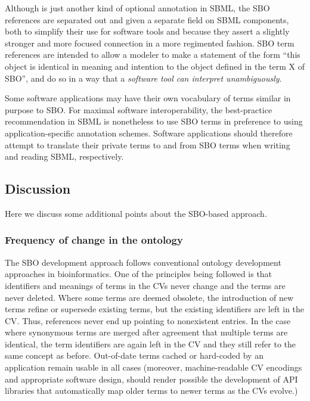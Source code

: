 Although  is just another kind of optional
annotation in SBML, the SBO references are separated out and given
a separate field on SBML components, both to simplify their use
for software tools and because they assert a slightly stronger and
more focused connection in a more regimented fashion.  SBO term
references are intended to allow a modeler to make a statement of
the form ``this object is identical in meaning and intention to
the object defined in the term X of SBO'', and do so in a way
that a \emph{software tool can interpret unambiguously}.

Some software applications may have their own vocabulary of terms
similar in purpose to SBO.  For maximal software interoperability,
the best-practice recommendation in SBML is nonetheless to use SBO
terms in preference to using application-specific annotation
schemes.  Software applications should therefore attempt to
translate their private terms to and from SBO terms when writing
and reading SBML, respectively.

\subsection{Discussion}

Here we discuss some additional points about the SBO-based
approach.

\subsubsection{Frequency of change in the ontology}
\label{sec:sbo-frequency-of-change}

The SBO development approach follows conventional ontology
development approaches in bioinformatics.  One of the principles
being followed is that identifiers and meanings of terms in the
CVs never change and the terms are never deleted.  Where some
terms are deemed obsolete, the introduction of new terms refine or
supersede existing terms, but the existing identifiers are left in
the CV.  Thus, references never end up pointing to nonexistent
entries.  In the case where synonymous terms are merged after
agreement that multiple terms are identical, the term identifiers
are again left in the CV and they still refer to the same concept
as before.  Out-of-date terms cached or hard-coded by an
application remain usable in all cases (moreover, 
machine-readable CV encodings and appropriate software design,
should render possible the development of API libraries that automatically map
older terms to newer terms as the CVs evolve.)

